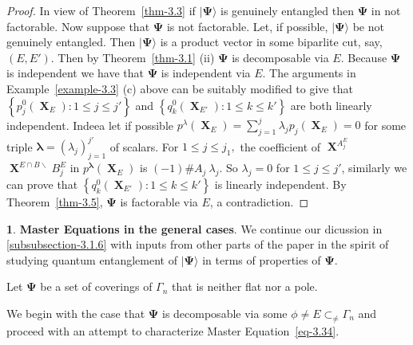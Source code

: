 \documentclass[a4paper,12pt]{article}
\DeclareMathOperator{\x}{\mathrm{X}}
\theoremstyle{definition}
\theoremstyle{underlinethm}
\theoremstyle{definition}
\newtheorem{subsubsec}{}[subsection]
\begin{document}
\begin{proof}
In view of Theorem~\ref{thm-3.3} if $| \boldsymbol{\Psi} \rangle$ is genuinely entangled then $\boldsymbol{\Psi}$ in not factorable. Now suppose that $\boldsymbol{\Psi}$ is not factorable. Let, if possible, $| \boldsymbol{\Psi} \rangle$ be not genuinely entangled. Then $| \boldsymbol{\Psi} \rangle$ is a 
product vector in some biparlite cut, say, $(E, E')$. Then by Theorem~\ref{thm-3.1} (ii) $\boldsymbol{\Psi}$ is decomposable via $E$. Because $\boldsymbol{\Psi}$ is independent we have that $\boldsymbol{\Psi}$ is independent via $E$. The arguments in Example~\ref{example-3.3} (c) above can be suitably modified to give that $\left\{p_{j}^{0}(\boldsymbol{\x}_{E}) : 1 \leq j \leq j' \right\}$ and $\left\{q_{k}^{0} (\boldsymbol{\x}_{E'})  : 1 \leq k \leq k'\right\}$ are both linearly independent. Indeea let if possible $p^{\lambda}(\boldsymbol{\x}_{E}) = \sum\limits_{j=1}^{j} \lambda_{j} p_{j}(\boldsymbol{\x}_{E}) = 0$ for some triple $\boldsymbol{\lambda} = (\lambda_{j})^{j'}_{j=1}$ of scalars. For $1 \leq j \leq j_{1}, $ the coefficient of $\boldsymbol{\x}^{A_{j}^{E}}$ $\boldsymbol{\x}^{E \cap B \smallsetminus} B_{j}^{E}$ in $p^{\boldsymbol{\lambda}} (\boldsymbol{\x}_{E})$ is $(-1) \# A_{j}~ \lambda_{j}$. So $\lambda_{j} = 0$ for $1 \leq j \leq j'$, similarly we can prove that $\left\{q_{k}^{0}(\boldsymbol{\x}_{E'}) : 1 \leq k \leq k' \right\}$ is linearly independent. By Theorem~\ref{thm-3.5}, $\boldsymbol{\Psi}$ is factorable via $E$, a contradiction.
\end{proof}

\begin{subsubsec}\label{subsubsection-3.1.7}
\textbf{Master Equations in the general cases}. We continue our dicussion in \eqref{subsubsection-3.1.6} with inputs from other parts of the paper in the spirit of studying quantum entanglement of $| \boldsymbol{\Psi} \rangle$ in terms of properties of $\boldsymbol{\Psi}$.

Let $\boldsymbol{\Psi}$ be a set of coverings of $\Gamma_{n}$ that is neither flat nor a pole.

We begin with the case that $\boldsymbol{\Psi}$ is decomposable via some $\phi \neq E \subset_{\neq} \Gamma_{n}$ and proceed with an attempt to characterize Master Equation~\eqref{eq-3.34}.
\end{subsubsec}
\end{document}
